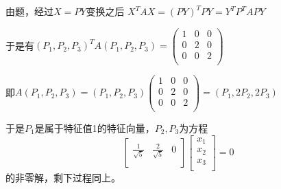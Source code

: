 \documentclass[lang=cn,10pt]{elegantbook}
\begin{document}
\begin{solution}
	
	由题，经过$X=PY$变换之后
	$X^{T}AX=(PY)^{T}PY=Y^{T}P^{T}APY$
	
	于是有$(P_{1},P_{2},P_{3})^{T}A(P_{1},P_{2},P_{3})=\left( \begin{matrix}
		1&		0&		0\\
		0&		2&		0\\
		0&		0&		2\\
	\end{matrix} \right) $
	
	即$A(P_{1},P_{2},P_{3})=(P_{1},P_{2},P_{3})\left( \begin{matrix}
		1&		0&		0\\
		0&		2&		0\\
		0&		0&		2\\
	\end{matrix} \right)=(P_{1},2P_{2},2P_{3})$
	
	于是$P_{1}$是属于特征值1的特征向量，$P_{2},P_{3}$为方程
	\begin{equation*}
		\left[ \begin{matrix}
			\frac{1}{\sqrt{5}}&		\frac{2}{\sqrt{5}}&		0\\
		\end{matrix} \right] \left[ \begin{array}{c}
		x_1\\
		x_2\\
		x_3\\
		\end{array} \right] =0
	\end{equation*}
	的非零解，剩下过程同上。
\end{solution}
\end{document}
